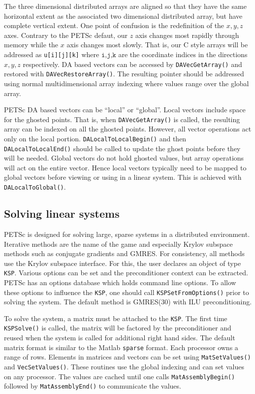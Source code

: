 \documentclass[final]{amsart}
\renewcommand{\t}[1]{\texttt{#1}}
\begin{document}
The three dimensional distributed arrays are aligned so that they have the same horizontal
extent as the associated two dimensional distributed array, but have complete vertical
extent. One point of confusion is the redefinition of the $x,y,z$ axes. Contrary to the
PETSc defaut, our $z$ axis changes most rapidly through memory while the $x$ axis changes
most slowly. That is, our C style arrays will be addressed as \texttt{u[i][j][k]} where
$\texttt{i,j,k}$ are the coordinate indices in the directions $x,y,z$ respectively. DA
based vectors can be accessed by \texttt{DAVecGetArray()} and restored with
\texttt{DAVecRestoreArray()}. The resulting pointer should be addressed using normal
multidimensional array indexing where values range over the global array.

PETSc DA based vectors can be ``local'' or ``global''. Local vectors include space for the
ghosted points. That is, when \texttt{DAVecGetArray()} is called, the resulting array can
be indexed on all the ghosted points. However, all vector operations act only on the local
portion. \texttt{DALocalToLocalBegin()} and then \texttt{DALocalToLocalEnd()} should be
called to update the ghost points before they will be needed. Global vectors do not hold
ghosted values, but array operations will act on the entire vector. Hence local vectors
typically need to be mapped to global vectors before viewing or using in a linear system.
This is achieved with \texttt{DALocalToGlobal()}.

\subsection{Solving linear systems}
PETSc is designed for solving large, sparse systems in a distributed environment.
Iterative methods are the name of the game and especially Krylov subspace methods such as
conjugate gradients and GMRES. For consistency, all methods use the Krylov subspace
interface. For this, the user declares an object of type \texttt{KSP}. Various options can
be set and the preconditioner context can be extracted. PETSc has an options database
which holds command line options. To allow these options to influence the \t{KSP}, one
should call \t{KSPSetFromOptions()} prior to solving the system. The default method is
GMRES(30) with ILU preconditioning.

To solve the system, a matrix must be attached to the \t{KSP}. The first time
\t{KSPSolve()} is called, the matrix will be factored by the preconditioner and reused
when the system is called for additional right hand sides. The default matrix format is
similar to the Matlab \t{sparse} format. Each processor owns a range of rows. Elements in
matrices and vectors can be set using \t{MatSetValues()} and \t{VecSetValues()}. These
routines use the global indexing and can set values on any processor. The values are
cached until one calls \t{MatAssemblyBegin()} followed by \t{MatAssemblyEnd()} to
communicate the values.
\end{document}

